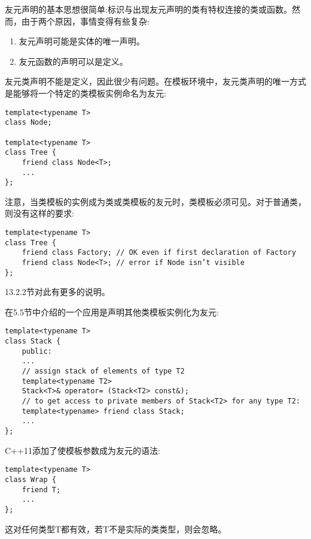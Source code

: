 
友元声明的基本思想很简单:标识与出现友元声明的类有特权连接的类或函数。然而，由于两个原因，事情变得有些复杂:

\begin{enumerate}
\item 
友元声明可能是实体的唯一声明。

\item 
友元函数的声明可以是定义。
\end{enumerate}


友元类声明不能是定义，因此很少有问题。在模板环境中，友元类声明的唯一方式是能够将一个特定的类模板实例命名为友元:

\begin{lstlisting}[style=styleCXX]
template<typename T>
class Node;

template<typename T>
class Tree {
	friend class Node<T>;
	...
};
\end{lstlisting}

注意，当类模板的实例成为类或类模板的友元时，类模板必须可见。对于普通类，则没有这样的要求:

\begin{lstlisting}[style=styleCXX]
template<typename T>
class Tree {
	friend class Factory; // OK even if first declaration of Factory
	friend class Node<T>; // error if Node isn’t visible
};
\end{lstlisting}

13.2.2节对此有更多的说明。

在5.5节中介绍的一个应用是声明其他类模板实例化为友元:

\begin{lstlisting}[style=styleCXX]
template<typename T>
class Stack {
	public:
	...
	// assign stack of elements of type T2
	template<typename T2>
	Stack<T>& operator= (Stack<T2> const&);
	// to get access to private members of Stack<T2> for any type T2:
	template<typename> friend class Stack;
	...
};
\end{lstlisting}

C++11添加了使模板参数成为友元的语法:

\begin{lstlisting}[style=styleCXX]
template<typename T>
class Wrap {
	friend T;
	...
};
\end{lstlisting}

这对任何类型T都有效，若T不是实际的类类型，则会忽略。


